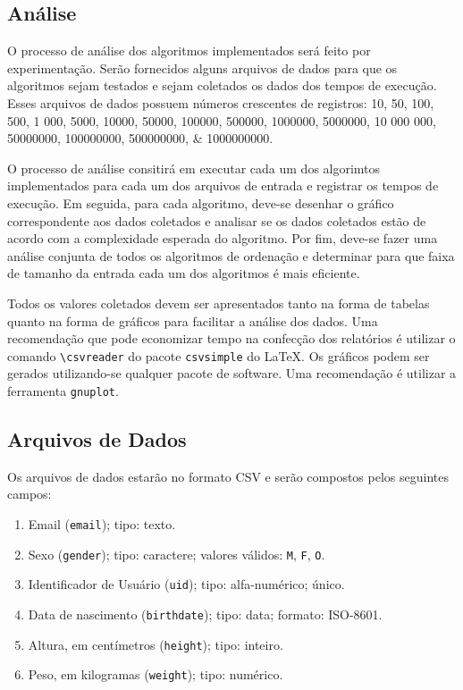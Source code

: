 \documentclass[a4paper,12pt]{scrartcl}
\begin{document}
\subsection{Análise}

O processo de análise dos algoritmos implementados será feito por
experimentação. Serão fornecidos alguns arquivos de dados para que os algoritmos
sejam testados e sejam coletados os dados dos tempos de execução. Esses arquivos
de dados possuem números crescentes de registros: \numlist{10; 50; 100; 500; 1
  000; 5 000; 10 000; 50 000; 100 000; 500 000; 1 000 000; 5 000 000; 10 000
  000; 50 000 000; 100 000 000; 500 000 000; 1 000 000 000}.

O processo de análise consitirá em executar cada um dos algorimtos implementados
para cada um dos arquivos de entrada e registrar os tempos de execução. Em
seguida, para cada algoritmo, deve-se desenhar o gráfico correspondente aos
dados coletados e analisar se os dados coletados estão de acordo com a
complexidade esperada do algoritmo. Por fim, deve-se fazer uma análise conjunta
de todos os algoritmos de ordenação e determinar para que faixa de tamanho da
entrada cada um dos algoritmos é mais eficiente.

Todos os valores coletados devem ser apresentados tanto na forma de tabelas
quanto na forma de gráficos para facilitar a análise dos dados. Uma recomendação
que pode economizar tempo na confecção dos relatórios é utilizar o comando
\verb|\csvreader| do pacote \texttt{csvsimple} do \LaTeX{}. Os gráficos podem ser
gerados utilizando-se qualquer pacote de software. Uma recomendação é utilizar a
ferramenta \texttt{gnuplot}.


\subsection{Arquivos de Dados}

Os arquivos de dados estarão no formato CSV e serão compostos pelos seguintes
campos:

\begin{enumerate}
\item Email (\texttt{email}); tipo: texto.
\item Sexo (\texttt{gender}); tipo: caractere; valores válidos: \texttt{M},
  \texttt{F}, \texttt{O}.
\item Identificador de Usuário (\texttt{uid}); tipo: alfa-numérico; único.
\item Data de nascimento (\texttt{birthdate}); tipo: data; formato: ISO-8601.
\item Altura, em centímetros (\texttt{height}); tipo: inteiro.
\item Peso, em kilogramas (\texttt{weight}); tipo: numérico.
\end{enumerate}
\end{document}
